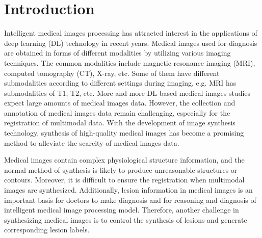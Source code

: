 \documentclass[runningheads]{llncs}
\begin{document}
	\section{Introduction}
	Intelligent medical images processing has attracted interest in the applications of deep learning (DL) technology in recent years. Medical images used for diagnosis are obtained in forms of different modalities by utilizing various imaging techniques. The common modalities include magnetic resonance imaging (MRI), computed tomography (CT), X-ray, etc. Some of them have different submodalities according to different settings during imaging, e.g. MRI has submodalities of T1, T2, etc. More and more DL-based medical images studies expect large amounts of medical images data. However, the collection and annotation of medical images data remain challenging, especially for the registration of multimodal data. With the development of image synthesis technology, synthesis of high-quality medical images has become a promising method to alleviate the scarcity of medical images data.
	
	Medical images contain complex physiological structure information, and the normal method of synthesis is likely to produce unreasonable structures or contours. Moreover, it is difficult to ensure the registration when multimodal images are synthesized. Additionally, lesion information in medical images is an important basis for doctors to make diagnosis and for reasoning and diagnosis of intelligent medical image processing model. Therefore, another challenge in synthesizing medical images is to control the synthesis of lesions and generate corresponding lesion labels.
	
\end{document}
